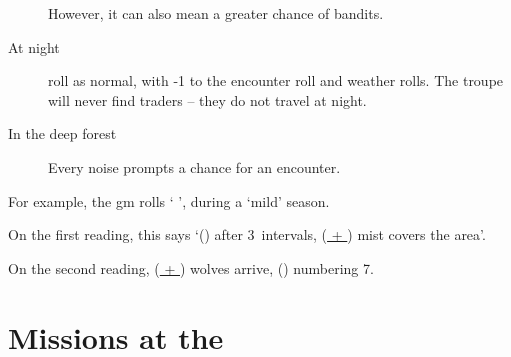 \begin{multicols}{2}
\begin{description}
  However, it can also mean a greater chance of bandits.

  \item[At night]
  roll as normal, with -1 to the encounter roll and weather rolls.
  The troupe will never find traders -- they do not travel at night.
  \item[In the deep forest]
  Every noise prompts a chance for an encounter.
\end{description}

\begin{exampletext}
  For example, the \gls{gm} rolls `  ', during a `mild' season.

  On the first reading, this says `() after 3~\glspl{interval}, (\underline{ + }) mist covers the area'.

  On the second reading, (\underline{ + }) wolves arrive, () numbering 7.


\end{exampletext}

\end{multicols}


\section{Missions at the }
\label{NGmissions}


